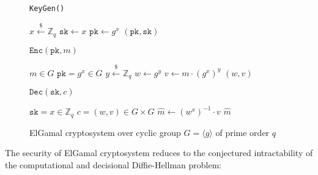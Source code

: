 \documentclass[runningheads]{llncs}
\newcommand{\encrypt}{\texttt{Enc}}
\newcommand{\decrypt}{\texttt{Dec}}
\newcommand{\pk}{\texttt{pk}}
\newcommand{\sk}{\texttt{sk}}
\newcommand{\leftsample}{\stackrel{\$}{\leftarrow}}
\begin{document}
\begin{figure}[H]
    \centering

    \begin{minipage}[t]{0.32\textwidth}
        \begin{algorithm}[H]
            \caption*{\texttt{KeyGen()}}
            \begin{algorithmic}[1]
                \State $x \leftsample \mathbb{Z}_q$
                \State $\sk \leftarrow x$
                \State $\pk \leftarrow g^x$
                \State \Return $(\pk, \sk)$
            \end{algorithmic}
        \end{algorithm}
    \end{minipage}\hfill
    \begin{minipage}[t]{0.31\textwidth}
        \begin{algorithm}[H]
            \caption*{$\encrypt(\pk, m)$}
            \begin{algorithmic}[1]
                \Require $m \in G$
                \Require $\pk = g^x \in G$
                \State $y \leftsample \mathbb{Z}_q$
                \State $w \leftarrow g^y$
                \State $v \leftarrow m \cdot (g^x)^y$
                \State \Return $(w, v)$
            \end{algorithmic}
        \end{algorithm}
    \end{minipage}\hfill
    \begin{minipage}[t]{0.35\textwidth}
        \begin{algorithm}[H]
            \caption*{$\decrypt(\sk, c)$}
            \begin{algorithmic}[1]
                \Require $\sk = x \in \mathbb{Z}_q$
                \Require $c = (w, v) \in G \times G$
                \State $\hat{m} \leftarrow (w^x)^{-1}\cdot v$
                \State \Return $\hat{m}$
            \end{algorithmic}
        \end{algorithm}
    \end{minipage}
    
    \caption{ElGamal cryptosystem over cyclic group $G = \langle g \rangle$ of prime order $q$}\label{fig:elgamal-routines}
\end{figure}

The security of ElGamal cryptosystem reduces to the conjectured intractability of the computational and decisional Diffie-Hellman problem:
\end{document}
